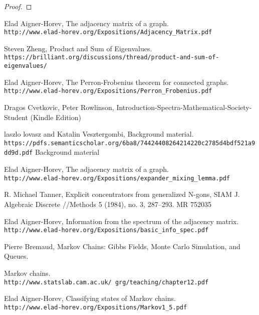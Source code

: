 \documentclass[a4paper, 11pt, oneside]{article}
\newenvironment{problem}[1]
  {\renewcommand\theinnercustomprob{#1}\innercustomprob}
  {\endinnercustomprob}
\begin{document}
 \begin{problem}{11}\label{problem11}
\end{problem}
\begin{proof}

\end{proof}		

\begin{thebibliography}{9} 
Elad Aigner-Horev,
The adjacency matrix of a graph.
\\\texttt{http://www.elad-horev.org/Expositions/Adjacency\_Matrix.pdf}

Steven Zheng,
Product and Sum of Eigenvalues.
\\\texttt{https://brilliant.org/discussions/thread/product-and-sum-of-eigenvalues/}

Elad Aigner-Horev,
The Perron-Frobenius theorem for connected graphs.
\\\texttt{http://www.elad-horev.org/Expositions/Perron\_Frobenius.pdf}

Dragos Cvetkovic, Peter Rowlinson,
Introduction-Spectra-Mathematical-Society-Student (Kindle Edition)

laszlo lovasz and Katalin Vesztergombi,
Background material.
\\\texttt{https://pdfs.semanticscholar.org/6ba8/74424408264214220c2785d4bdf521a9dd9d.pdf}
Background material

Elad Aigner-Horev,
The adjacency matrix of a graph.
\\\texttt{http://www.elad-horev.org/Expositions/expander\_mixing\_lemma.pdf}

R. Michael Tanner, Explicit concentrators from generalized N-gons, SIAM J. Algebraic Discrete
//Methods 5 (1984), no. 3, 287–293. MR 752035


Elad Aigner-Horev,
Information from the spectrum of the adjacency matrix.
\\\texttt{http://www.elad-horev.org/Expositions/basic\_info\_spec.pdf}

Pierre Bremaud,
Markov Chains: Gibbs Fields, Monte Carlo Simulation, and Queues.

Markov chains.
\\\texttt{http://www.statslab.cam.ac.uk/~grg/teaching/chapter12.pdf}

Elad Aigner-Horev,
Classifying states of Markov chains.
\\\texttt{http://www.elad-horev.org/Expositions/Markov1\_5.pdf}
\end{thebibliography}
\end{document}
